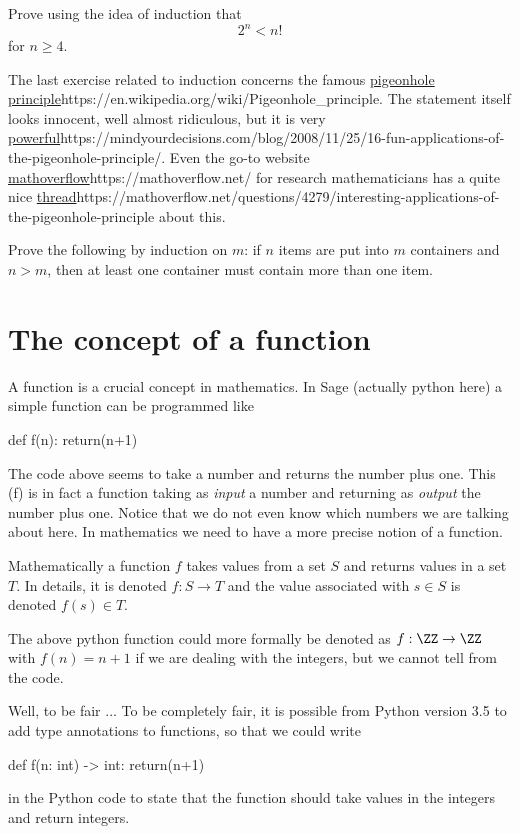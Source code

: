 \documentclass{article}
\begin{document}
\beginshex
Prove using the idea of induction that
$$
2^n < n!
$$
for $n\geq 4$.
\endshex

The last exercise related to induction concerns the famous \url{pigeonhole principle}{https://en.wikipedia.org/wiki/Pigeonhole_principle}. The statement itself looks innocent, well almost ridiculous, but it is very \url{powerful}{https://mindyourdecisions.com/blog/2008/11/25/16-fun-applications-of-the-pigeonhole-principle/}. Even the go-to website 
\url{mathoverflow}{https://mathoverflow.net/} for research mathematicians has 
a quite nice \url{thread}{https://mathoverflow.net/questions/4279/interesting-applications-of-the-pigeonhole-principle} 
about this.

\beginshex
Prove the following by induction on $m$: if $n$ items are put into $m$ containers and 
$n > m$, then at least one container must contain more than one item.
\endshex

\section{The concept of a function}

A function is a crucial concept in mathematics. In Sage (actually python here) a simple function can be
programmed like

\begin{code}
def f(n): return(n+1) 
\end{code}

The code above seems to take a number and returns the number plus one. This (f) is in fact a function 
taking as \emph{input} a number and returning as \emph{output} the number plus one. Notice that
we do not even know which numbers we are talking about here. In mathematics we need to have
a more precise notion of a function. 


Mathematically a function $f$ takes values from a set $S$ and returns values in a set $T$. In details,
it is denoted $f: S\rightarrow T$ and the value associated with $s\in S$ is denoted $f(s)\in T$.

The above python function could more formally be denoted as $f: \ZZ\rightarrow \ZZ$ with
$f(n) = n+1$ if we are dealing with the integers, but we cannot tell from the code.

\begin{hideinbutton}{Well, to be fair ...}
To be completely fair, it is possible from Python version 3.5 to add type annotations to functions, so that we could write
\begin{code}
def f(n: int) -> int: return(n+1)
\end{code}
in the Python code to state that the function should take values in the integers and return integers.
\end{hideinbutton}
\end{document}
